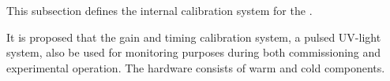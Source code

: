 






This subsection defines the internal calibration system for the \single {}. 

It is proposed that the \single {} gain and timing calibration system, a pulsed UV-light system, also be used for  monitoring purposes during both commissioning and experimental operation. The hardware consists of warm and cold components.  

